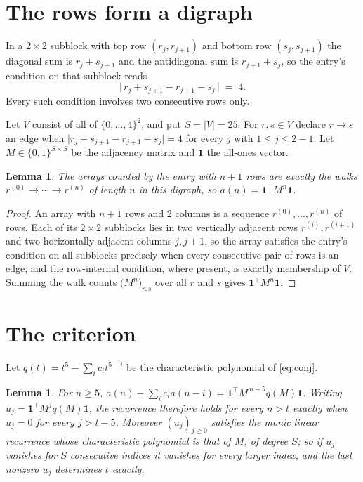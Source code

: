 \documentclass[11pt,a4paper]{article}
\theoremstyle{plain}
\newtheorem{lemma}[theorem]{Lemma}
\theoremstyle{definition}
\begin{document}
\section{The rows form a digraph}

In a $2\times2$ subblock with top row $(r_j,r_{j+1})$ and bottom row $(s_j,s_{j+1})$ the
diagonal sum is $r_j+s_{j+1}$ and the antidiagonal sum is $r_{j+1}+s_j$, so the entry's
condition on that subblock reads
\[
\bigl|\,r_j+s_{j+1}-r_{j+1}-s_j\,\bigr|\;=\;4.
\]
Every such condition involves two consecutive rows only.

Let $V$ consist of all of $\{0,\dots,4\}^{2}$, and put $S=|V|=25$. For $r,s\in V$ declare $r\to s$ an edge
when $\bigl|r_j+s_{j+1}-r_{j+1}-s_j\bigr|=4$ for every $j$ with
$1\le j\le2-1$. Let $M\in\{0,1\}^{S\times S}$ be the adjacency matrix and $\mathbf{1}$
the all-ones vector.

\begin{lemma}\label{lem:walk}
The arrays counted by the entry with $n+1$ rows are exactly the walks
$r^{(0)}\to\cdots\to r^{(n)}$ of length $n$ in this digraph, so
$a(n)=\mathbf{1}^{\!\top}M^{n}\mathbf{1}$.
\end{lemma}

\begin{proof}
An array with $n+1$ rows and $2$ columns is a sequence $r^{(0)},\dots,r^{(n)}$ of
rows. Each of its $2\times2$ subblocks lies in two vertically adjacent rows
$r^{(i)},r^{(i+1)}$ and two horizontally adjacent columns $j,j+1$, so the array satisfies
the entry's condition on all subblocks precisely when every consecutive pair of rows is an
edge; and the row-internal condition, where present, is exactly membership of $V$. Summing
the walk counts $\bigl(M^{n}\bigr)_{r,s}$ over all $r$ and $s$ gives
$\mathbf{1}^{\!\top}M^{n}\mathbf{1}$.
\end{proof}

\section{The criterion}

Let $q(t)=t^{5}-\sum_i c_i t^{5-i}$ be the characteristic polynomial of
\eqref{eq:conj}.

\begin{lemma}\label{lem:crit}
For $n\ge5$,
$a(n)-\sum_i c_i a(n-i)=\mathbf{1}^{\!\top}M^{\,n-5}q(M)\mathbf{1}$. Writing
$u_j=\mathbf{1}^{\!\top}M^{j}q(M)\mathbf{1}$, the recurrence therefore holds for every
$n>t$ exactly when $u_j=0$ for every $j>t-5$. Moreover $(u_j)_{j\ge0}$ satisfies the
monic linear recurrence whose characteristic polynomial is that of $M$, of degree $S$; so
if $u_j$ vanishes for $S$ consecutive indices it vanishes for every larger index, and the
last nonzero $u_j$ determines $t$ exactly.
\end{lemma}
\end{document}
